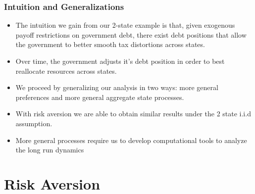 \documentclass{beamer}
\begin{document}
\begin{frame}
	\frametitle{Intuition and Generalizations}
	\begin{itemize}
		\item The intuition we gain from our 2-state example is that, given exogenous payoff restrictions on government debt, there exist debt positions that allow the government to better smooth tax distortions across states.
		\item  Over time, the government adjusts it's debt position in order to best reallocate resources across states.
		\item  We proceed by generalizing our analysis in two ways:  more general preferences and more general aggregate state processes.
		\item  With risk aversion we are able to obtain similar results under the 2 state i.i.d assumption.
		\item More general processes require us to develop computational tools to analyze the long run dynamics
	\end{itemize}
\end{frame}

\section{Risk Aversion}
\end{document}
